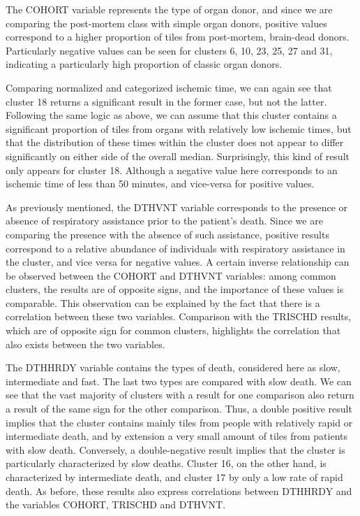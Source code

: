 \documentclass[a4paper, 11pt]{article}
\begin{document}
\begin{multicols}{2}
The COHORT variable represents the type of organ donor, and since we are comparing the post-mortem class with simple organ donors, positive values correspond to a higher proportion of tiles from post-mortem, brain-dead donors. Particularly negative values can be seen for clusters 6, 10, 23, 25, 27 and 31, indicating a particularly high proportion of classic organ donors.

Comparing normalized and categorized ischemic time, we can again see that cluster 18 returns a significant result in the former case, but not the latter. Following the same logic as above, we can assume that this cluster contains a significant proportion of tiles from organs with relatively low ischemic times, but that the distribution of these times within the cluster does not appear to differ significantly on either side of the overall median. Surprisingly, this kind of result only appears for cluster 18. Although a negative value here corresponds to an ischemic time of less than 50 minutes, and vice-versa for positive values.

As previously mentioned, the DTHVNT variable corresponds to the presence or absence of respiratory assistance prior to the patient's death. Since we are comparing the presence with the absence of such assistance, positive results correspond to a relative abundance of individuals with respiratory assistance in the cluster, and vice versa for negative values. A certain inverse relationship can be observed between the COHORT and DTHVNT variables: among common clusters, the results are of opposite signs, and the importance of these values is comparable. This observation can be explained by the fact that there is a correlation between these two variables. Comparison with the TRISCHD results, which are of opposite sign for common clusters, highlights the correlation that also exists between the two variables. 

The DTHHRDY variable contains the types of death, considered here as slow, intermediate and fast. The last two types are compared with slow death. We can see that the vast majority of clusters with a result for one comparison also return a result of the same sign for the other comparison. Thus, a double positive result implies that the cluster contains mainly tiles from people with relatively rapid or intermediate death, and by extension a very small amount of tiles from patients with slow death. Conversely, a double-negative result implies that the cluster is particularly characterized by slow deaths. Cluster 16, on the other hand, is characterized by intermediate death, and cluster 17 by only a low rate of rapid death. As before, these results also express correlations between DTHHRDY and the variables COHORT, TRISCHD and DTHVNT. 


\end{multicols}
\end{document}
